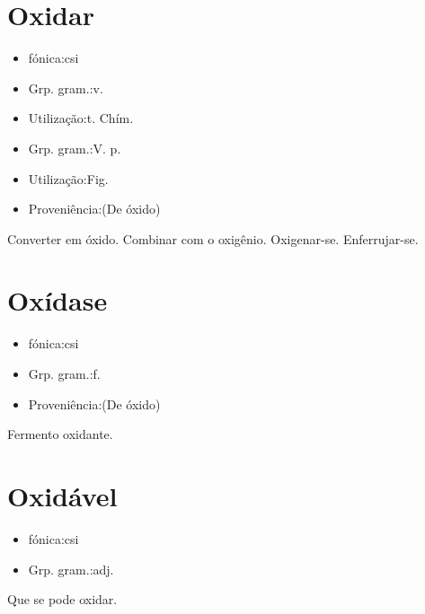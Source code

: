 \section{Oxidar}
\begin{itemize}
\item {fónica:csi}
\end{itemize}
\begin{itemize}
\item {Grp. gram.:v.}
\end{itemize}
\begin{itemize}
\item {Utilização:t. Chím.}
\end{itemize}
\begin{itemize}
\item {Grp. gram.:V. p.}
\end{itemize}
\begin{itemize}
\item {Utilização:Fig.}
\end{itemize}
\begin{itemize}
\item {Proveniência:(De \textunderscore óxido\textunderscore )}
\end{itemize}
Converter em óxido.
Combinar com o oxigênio.
Oxigenar-se.
Enferrujar-se.
\section{Oxídase}
\begin{itemize}
\item {fónica:csi}
\end{itemize}
\begin{itemize}
\item {Grp. gram.:f.}
\end{itemize}
\begin{itemize}
\item {Proveniência:(De \textunderscore óxido\textunderscore )}
\end{itemize}
Fermento oxidante.
\section{Oxidável}
\begin{itemize}
\item {fónica:csi}
\end{itemize}
\begin{itemize}
\item {Grp. gram.:adj.}
\end{itemize}
Que se pode oxidar.
